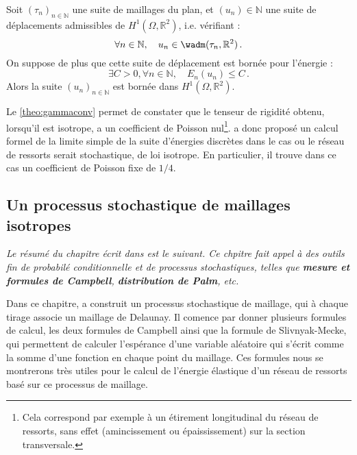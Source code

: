 \begin{theorem}
    Soit $(\tau_n)_{n\in\mathbb{N}}$ une suite de maillages du plan, et $(u_n) \in \mathbb{N}$ une suite de déplacements admissibles de $H^1(\Omega, \mathbb{R}^2)$, i.e. vérifiant :
    $$
        \forall n \in \mathbb{N}, \quad u_n \in \wadm (\tau_n, \mathbb{R}^2) \,.
    $$
    On suppose de plus que cette suite de déplacement est bornée pour l’énergie :
    $$
    \exists C > 0 , \forall n \in \mathbb{N}, \quad E_{n}(u_n) \leq C \,.
    $$
    Alors la suite $(u_n)_{n \in \mathbb{N}}$ est bornée dans $H^1(\Omega, \mathbb{R}^2)$.
\end{theorem}
\noindent Le \cref{theo:gammaconv} permet de constater que le tenseur de rigidité obtenu, lorsqu’il est isotrope, a un coefficient de Poisson nul\footnote{Cela correspond par exemple à un étirement longitudinal du réseau de ressorts, sans effet (amincissement ou épaississement) sur la section transversale.}. \citeauthor{balasoiu2020halthesis} a donc proposé un calcul formel de la limite simple de la suite d’énergies discrètes dans le cas ou le réseau de ressorts serait stochastique, de loi isotrope. En particulier, il trouve dans ce cas un coefficient de Poisson fixe de $1/4$.







\subsection{Un processus stochastique de maillages isotropes} 

\textit{Le résumé du chapitre écrit dans \parencite[p.136]{balasoiu2020halthesis} est le suivant. Ce chpitre fait appel à des outils fin de probabilé conditionnelle et de processus stochastiques, telles que \textbf{mesure et formules de Campbell}, \textbf{distribution de Palm}, etc. }

Dans ce chapitre, \citeauthor{balasoiu2020halthesis} a construit un processus stochastique de maillage, qui à chaque tirage associe un maillage de Delaunay. Il comence par donner plusieurs formules de calcul, les deux formules de Campbell ainsi que la formule de Slivnyak-Mecke, qui permettent de calculer l’espérance d’une variable aléatoire qui s’écrit comme la somme d’une fonction en chaque point du maillage. Ces formules nous se montrerons très utiles pour le calcul de l’énergie élastique d’un réseau de ressorts basé sur ce processus de maillage.


